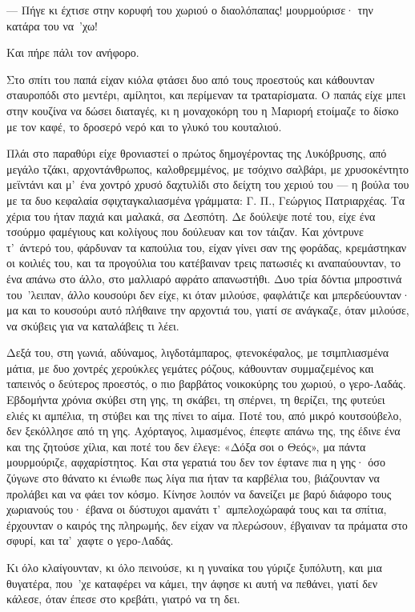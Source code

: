 \documentclass[diploma]{softlab-thesis}
\begin{document}
--- Πήγε κι έχτισε στην κορυφή του χωριού ο διαολόπαπας! μουρμούρισε· την
κατάρα του να~’χω!

Και πήρε πάλι τον ανήφορο.

Στο σπίτι του παπά είχαν κιόλα φτάσει δυο από τους προεστούς και κάθουνταν
σταυροπόδι στο μεντέρι, αμίλητοι, και περίμεναν τα τραταρίσματα. Ο παπάς
είχε μπει στην κουζίνα να δώσει διαταγές, κι η μοναχοκόρη του η Μαριορή
ετοίμαζε το δίσκο με τον καφέ, το δροσερό νερό και το γλυκό του κουταλιού.

Πλάι στο παραθύρι είχε θρονιαστεί ο πρώτος δημογέροντας της Λυκόβρυσης, από
μεγάλο τζάκι, αρχοντάνθρωπος, καλοθρεμμένος, με τσόχινο σαλβάρι, με
χρυσοκέντητο μεϊντάνι και μ’~ένα χοντρό χρυσό δαχτυλίδι στο δείχτη του
χεριού του --- η βούλα του με τα δυο κεφαλαία σφιχταγκαλιασμένα γράμματα:
Γ. Π., Γεώργιος Πατριαρχέας. Τα χέρια του ήταν παχιά και μαλακά, σα
Δεσπότη. Δε δούλεψε ποτέ του, είχε ένα τσούρμο φαμέγιους και κολίγους που
δούλευαν και τον τάιζαν. Και χόντρυνε τ’~άντερό του, φάρδυναν τα καπούλια
του, είχαν γίνει σαν της φοράδας, κρεμάστηκαν οι κοιλιές του, και τα
προγούλια του κατέβαιναν τρεις πατωσιές κι αναπαύουνταν, το ένα απάνω στο
άλλο, στο μαλλιαρό αφράτο απανωστήθι. Δυο τρία δόντια μπροστινά του~’λειπαν,
άλλο κουσούρι δεν είχε, κι όταν μιλούσε, φαφλάτιζε και μπερδεύουνταν· μα και
το κουσούρι αυτό πλήθαινε την αρχοντιά του, γιατί σε ανάγκαζε, όταν μιλούσε,
να σκύβεις για να καταλάβεις τι λέει.

Δεξά του, στη γωνιά, αδύναμος, λιγδοτάμπαρος, φτενοκέφαλος, με τσιμπλιασμένα
μάτια, με δυο χοντρές χερούκλες γεμάτες ρόζους, κάθουνταν συμμαζεμένος και
ταπεινός ο δεύτερος προεστός, ο πιο βαρβάτος νοικοκύρης του χωριού, ο
γερο-Λαδάς. Εβδομήντα χρόνια σκύβει στη γης, τη σκάβει, τη σπέρνει, τη
θερίζει, της φυτεύει ελιές κι αμπέλια, τη στύβει και της πίνει το αίμα. Ποτέ
του, από μικρό κουτσούβελο, δεν ξεκόλλησε από τη γης. Αχόρταγος, λιμασμένος,
έπεφτε απάνω της, της έδινε ένα και της ζητούσε χίλια, και ποτέ του δεν
έλεγε: «Δόξα σοι ο Θεός», μα πάντα μουρμούριζε, αφχαρίστητος. Και στα
γερατιά του δεν τον έφτανε πια η γης· όσο ζύγωνε στο θάνατο κι ένιωθε πως
λίγα πια ήταν τα καρβέλια του, βιάζουνταν να προλάβει και να φάει τον
κόσμο. Κίνησε λοιπόν να δανείζει με βαρύ διάφορο τους χωριανούς του· έβανα
οι δύστυχοι αμανάτι τ’~αμπελοχώραφά τους και τα σπίτια, έρχουνταν ο καιρός
της πληρωμής, δεν είχαν να πλερώσουν, έβγαιναν τα πράματα στο σφυρί, και
τα’~χαφτε ο γερο-Λαδάς.

Κι όλο κλαίγουνταν, κι όλο πεινούσε, κι η γυναίκα του γύριζε ξυπόλυτη, και
μια θυγατέρα, που~’χε καταφέρει να κάμει, την άφησε κι αυτή να πεθάνει,
γιατί δεν κάλεσε, όταν έπεσε στο κρεβάτι, γιατρό να τη δει.
\end{document}
